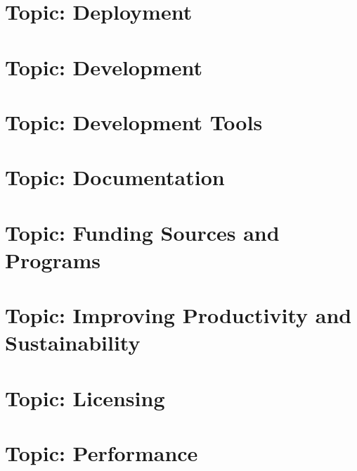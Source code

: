\documentclass[twoside]{book}
\newcommand{\+}{\discretionary{\mbox{\scriptsize$\hookleftarrow$}}{}{}}
\begin{document}
\chapter{Topic\+: Deployment}
\label{md_markdown_topic_deployment}

\chapter{Topic\+: Development}
\label{md_markdown_topic_development}

\chapter{Topic\+: Development Tools}
\label{md_markdown_topic_development_tools}

\chapter{Topic\+: Documentation}
\label{md_markdown_topic_documentation}

\chapter{Topic\+: Funding Sources and Programs}
\label{md_markdown_topic_funding_sources_and_programs}

\chapter{Topic\+: Improving Productivity and Sustainability}
\label{md_markdown_topic_improving_productivity_and_sustanability}

\chapter{Topic\+: Licensing}
\label{md_markdown_topic_licensing}

\chapter{Topic\+: Performance}
\label{md_markdown_topic_performance}

\end{document}
